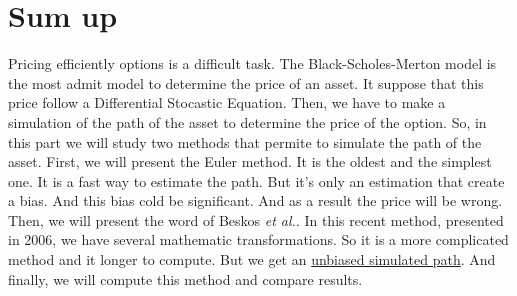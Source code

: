 \section{Sum up}
\label{sec:sumup}


Pricing efficiently options is a difficult task. The Black-Scholes-Merton model is the most admit model to determine the price of an asset. It suppose that this price follow a Differential Stocastic Equation. Then, we have to make a simulation of the path of the asset to determine the price of the option. So, in this part we will study two methods that permite to simulate the path of the asset.
\newline
First, we will present the Euler method. It is the oldest and the simplest one. It is a fast way to estimate the path. But it's only an estimation that create a bias. And this bias cold be significant. And as a result the price will be wrong.
\newline
Then, we will present the word of Beskos \textit{et al.}. In this recent method, presented in 2006, we have several mathematic transformations. So it is a more complicated method and it longer to compute. But we get an \underline{unbiased simulated path}.
\newline
And finally, we will compute this method and compare results.


